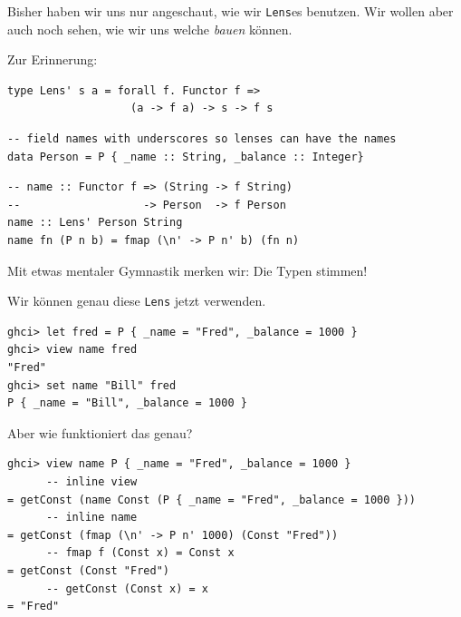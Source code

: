 \documentclass{beamer}
\begin{document}

\begin{frame}[fragile]

Bisher haben wir uns nur angeschaut, wie wir \texttt{Lens}es benutzen. Wir wollen aber auch noch sehen, wie wir uns welche \emph{bauen} können.
\smallskip
\smallskip

Zur Erinnerung:
\begin{verbatim}
type Lens' s a = forall f. Functor f =>
                   (a -> f a) -> s -> f s
\end{verbatim}
\smallskip

\begin{verbatim}
-- field names with underscores so lenses can have the names
data Person = P { _name :: String, _balance :: Integer}
\end{verbatim}
\bigskip

\begin{verbatim}
-- name :: Functor f => (String -> f String)
--                   -> Person  -> f Person
name :: Lens' Person String
name fn (P n b) = fmap (\n' -> P n' b) (fn n)
\end{verbatim}
\pause

Mit etwas mentaler Gymnastik merken wir: Die Typen stimmen!

\end{frame}


\begin{frame}[fragile]

Wir können genau diese \texttt{Lens} jetzt verwenden.
\pause

\begin{verbatim}
ghci> let fred = P { _name = "Fred", _balance = 1000 }
ghci> view name fred
"Fred"
ghci> set name "Bill" fred
P { _name = "Bill", _balance = 1000 }
\end{verbatim}
\pause

Aber wie funktioniert das genau?\pause

\begin{verbatim}
ghci> view name P { _name = "Fred", _balance = 1000 }
      -- inline view
= getConst (name Const (P { _name = "Fred", _balance = 1000 }))
      -- inline name
= getConst (fmap (\n' -> P n' 1000) (Const "Fred"))
      -- fmap f (Const x) = Const x
= getConst (Const "Fred")
      -- getConst (Const x) = x
= "Fred"
\end{verbatim}

\end{frame}
\end{document}

